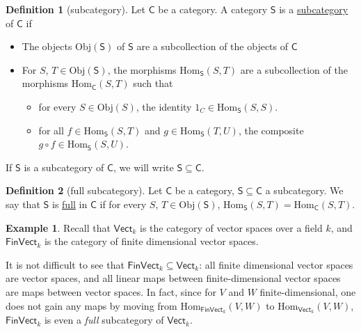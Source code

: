 \documentclass[a4paper]{report}
\newcommand{\defn}[1]{\ul{#1}}
\newcommand{\Obj}{\mathrm{Obj}}
\newcommand{\Hom}{\mathrm{Hom}}
\theoremstyle{definition}
\newtheorem{definition}{Definition}[section]
\newtheorem{example}{Example}[section]
\theoremstyle{plain}
\theoremstyle{remark}
\begin{document}
\begin{definition}[subcategory]
  \label{def:subcategory}
  Let $\mathsf{C}$ be a category. A category $\mathsf{S}$ is a \defn{subcategory} of $\mathsf{C}$ if
  \begin{itemize}
    \item The objects $\Obj(\mathsf{S})$ of $\mathsf{S}$ are a subcollection of the objects of $\mathsf{C}$

    \item For $S$, $T \in \Obj(\mathsf{S})$, the morphisms $\Hom_{\mathsf{S}}(S, T)$ are a subcollection of the morphisms $\Hom_{\mathsf{C}}(S, T)$ such that
      \begin{itemize}
        \item for every $S \in \Obj(S)$, the identity $1_{C} \in \Hom_{\mathsf{S}}(S, S)$.

        \item for all $f \in \Hom_{\mathsf{S}}(S, T)$ and $g \in \Hom_{\mathsf{S}}(T, U)$, the composite $g \circ f \in \Hom_{\mathsf{S}}(S, U)$.
      \end{itemize}
  \end{itemize} 

  If $\mathsf{S}$ is a subcategory of $\mathsf{C}$, we will write $\mathsf{S} \subseteq \mathsf{C}$.
\end{definition}

\begin{definition}[full subcategory]
  \label{def:fullsubcategory}
  Let $\mathsf{C}$ be a category, $\mathsf{S} \subseteq \mathsf{C}$ a subcategory. We say that $\mathsf{S}$ is \defn{full} in $\mathsf{C}$ if for every $S$, $T \in \Obj(\mathsf{S})$, $\Hom_{\mathsf{S}}(S, T) = \Hom_{\mathsf{C}}(S, T)$.
\end{definition}

\begin{example}
  \label{eg:finvectfullsubcategoryofvect}
  Recall that $\mathsf{Vect}_{k}$ is the category of vector spaces over a field $k$, and $\mathsf{FinVect}_{k}$ is the category of finite dimensional vector spaces. 

  It is not difficult to see that $\mathsf{FinVect}_{k} \subseteq \mathsf{Vect}_{k}$: all finite dimensional vector spaces are vector spaces, and all linear maps between finite-dimensional vector spaces are maps between vector spaces. In fact, since for $V$ and $W$ finite-dimensional, one does not gain any maps by moving from $\Hom_{\mathsf{FinVect}_{k}}(V, W)$ to $\Hom_{\mathsf{Vect}_{k}}(V, W)$, $\mathsf{FinVect}_{k}$ is even a \emph{full} subcategory of $\mathsf{Vect}_{k}$.
\end{example}
\end{document}
